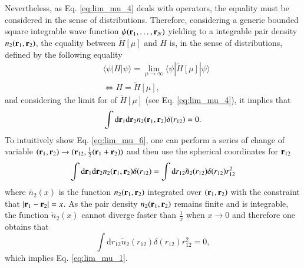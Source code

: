 \documentclass[aip,jcp,reprint,noshowkeys,superscriptaddress,twocolumn]{revtex4-1}
\newcommand{\matelem}[3]{\langle #1 | #2 | #3 \rangle}
\newcommand{\br}[0]{{\bf {r}}}
\begin{document}
Nevertheless, as Eq. \eqref{eq:lim_mu_4} deals with operators, the equality must be considered in the sense of distributions.  
Therefore, considering a generic bounded square integrable wave function $\psi(\br{}_1,\hdots,\br{}_N)$ yielding to a integrable pair density $n_2(\br{}_1,\br{}_2)$, the equality between $\tilde{H}[\mu]$ and $H$ is, in the sense of distributions, defined by the following equality 
\begin{equation}
 \label{eq:lim_mu_5}
 \begin{aligned}
& \matelem{\psi}{H}{\psi} = \lim_{\mu \rightarrow \infty} \matelem{\psi}{\tilde{H}[\mu]}{\psi} \\
& \Leftrightarrow H = \tilde{H}[\mu],
 \end{aligned}
\end{equation}
and considering the limit for of $\tilde{H}[\mu]$ (see Eq. \eqref{eq:lim_mu_4}), it implies that 
\begin{equation}
 \label{eq:lim_mu_6}
 \int \text{d}\br{}_1 \text{d}\br{}_2 n_2(\br{}_1,\br{}_2) \delta(r_{12}) = 0.
\end{equation}
To intuitively show Eq. \eqref{eq:lim_mu_6}, one can perform a series of change of variable $(\br{}_1,\br{}_2)\rightarrow (\br{}_{12},\frac{1}{2}(\br{}_1 + \br{}_2))$ and then use the spherical coordinates for $\br{}_{12}$ 
\begin{equation}
 \int \text{d}\br{}_1 \text{d}\br{}_2 n_2(\br{}_1,\br{}_2) \delta(r_{12}) = \int \text{d}r{}_{12}  \tilde{n}_2(r_{12}) \delta(r_{12}) r_{12}^2 
\end{equation}
where $\tilde{n_2}(x)$ is the function $n_2(\br{}_1,\br{}_2)$ integrated over $(\br{}_1,\br{}_2)$ with the constraint that 
$|\br{}_1-\br{}_2| = x$. 
As the pair density $n_2(\br{}_1,\br{}_2)$ remains finite and is integrable, the function $\tilde{n}_2(x)$ 
cannot diverge faster than $\frac{1}{x}$ when $x\rightarrow 0$ and therefore one obtains that 
\begin{equation}
 \int \text{d}r{}_{12}  \tilde{n}_2(r_{12}) \delta(r_{12}) r_{12}^2 = 0,
\end{equation}
which implies Eq. \eqref{eq:lim_mu_1}. 



                                                                                                                                                
\end{document}
